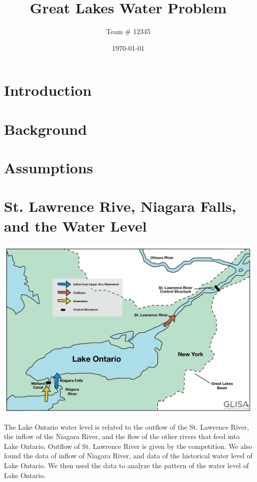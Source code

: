 \documentclass[pre,12pt]{revtex4-1}
\begin{document}
\title{Great Lakes Water Problem}
\author{Team \# 12345}
\date{\today}

\begin{abstract}


\end{abstract}
\maketitle

\newpage

\section{Introduction}\label{Introduction}

\section{Background}\label{Background}

\section{Assumptions}\label{Assumptions}

\section{St. Lawrence Rive, Niagara Falls, and the Water Level}\label{Model}

\begin{center}
\includegraphics[width=0.75\linewidth]{img/river_flow.jpeg}
\end{center}

The Lake Ontario water level is related to the outflow of the St. Lawrence River, the inflow of the Niagara River, and the flow of the other rivers that feed into Lake Ontario. Outflow of St. Lawrence River is given by the competition. We also found the data of inflow of Niagara River, and data of the historical water level of Lake Ontario. We then used the data to analyze the pattern of the water level of Lake Ontario.
\end{document}
